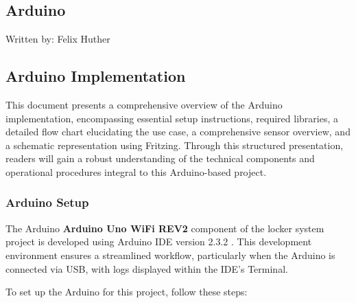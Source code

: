 \subsection{Arduino}
{\tiny Written by: Felix Huther}\\

\subsection{Arduino Implementation}

This document presents a comprehensive overview of the Arduino implementation, encompassing essential setup instructions, required libraries, a detailed flow chart elucidating the use case, a comprehensive sensor overview, and a schematic representation using Fritzing. Through this structured presentation, readers will gain a robust understanding of the technical components and operational procedures integral to this Arduino-based project.

\subsubsection{Arduino Setup}

The Arduino \textbf{Arduino Uno WiFi REV2} \cite{arduino_uno_wifi_rev2} component of the locker system project is developed using Arduino IDE version 2.3.2 \cite{arduino-software}. This development environment ensures a streamlined workflow, particularly when the Arduino is connected via USB, with logs displayed within the IDE's Terminal.

To set up the Arduino for this project, follow these steps:

